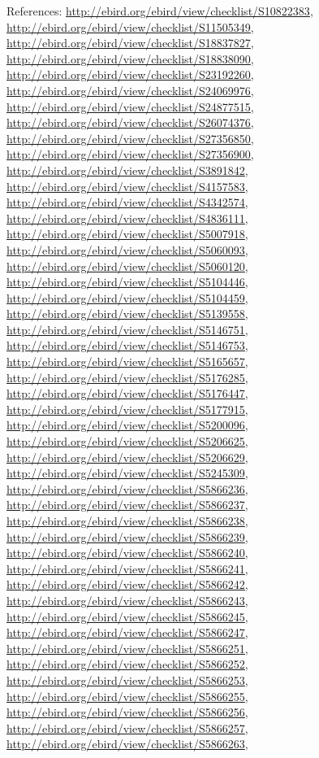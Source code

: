 \documentclass[9pt, article]{memoir}
\begin{document}
\begin{multicols}{2}
References: 
\url{http://ebird.org/ebird/view/checklist/S10822383}, 
\url{http://ebird.org/ebird/view/checklist/S11505349}, 
\url{http://ebird.org/ebird/view/checklist/S18837827}, 
\url{http://ebird.org/ebird/view/checklist/S18838090}, 
\url{http://ebird.org/ebird/view/checklist/S23192260}, 
\url{http://ebird.org/ebird/view/checklist/S24069976}, 
\url{http://ebird.org/ebird/view/checklist/S24877515}, 
\url{http://ebird.org/ebird/view/checklist/S26074376}, 
\url{http://ebird.org/ebird/view/checklist/S27356850}, 
\url{http://ebird.org/ebird/view/checklist/S27356900}, 
\url{http://ebird.org/ebird/view/checklist/S3891842}, 
\url{http://ebird.org/ebird/view/checklist/S4157583}, 
\url{http://ebird.org/ebird/view/checklist/S4342574}, 
\url{http://ebird.org/ebird/view/checklist/S4836111}, 
\url{http://ebird.org/ebird/view/checklist/S5007918}, 
\url{http://ebird.org/ebird/view/checklist/S5060093}, 
\url{http://ebird.org/ebird/view/checklist/S5060120}, 
\url{http://ebird.org/ebird/view/checklist/S5104446}, 
\url{http://ebird.org/ebird/view/checklist/S5104459}, 
\url{http://ebird.org/ebird/view/checklist/S5139558}, 
\url{http://ebird.org/ebird/view/checklist/S5146751}, 
\url{http://ebird.org/ebird/view/checklist/S5146753}, 
\url{http://ebird.org/ebird/view/checklist/S5165657}, 
\url{http://ebird.org/ebird/view/checklist/S5176285}, 
\url{http://ebird.org/ebird/view/checklist/S5176447}, 
\url{http://ebird.org/ebird/view/checklist/S5177915}, 
\url{http://ebird.org/ebird/view/checklist/S5200096}, 
\url{http://ebird.org/ebird/view/checklist/S5206625}, 
\url{http://ebird.org/ebird/view/checklist/S5206629}, 
\url{http://ebird.org/ebird/view/checklist/S5245309}, 
\url{http://ebird.org/ebird/view/checklist/S5866236}, 
\url{http://ebird.org/ebird/view/checklist/S5866237}, 
\url{http://ebird.org/ebird/view/checklist/S5866238}, 
\url{http://ebird.org/ebird/view/checklist/S5866239}, 
\url{http://ebird.org/ebird/view/checklist/S5866240}, 
\url{http://ebird.org/ebird/view/checklist/S5866241}, 
\url{http://ebird.org/ebird/view/checklist/S5866242}, 
\url{http://ebird.org/ebird/view/checklist/S5866243}, 
\url{http://ebird.org/ebird/view/checklist/S5866245}, 
\url{http://ebird.org/ebird/view/checklist/S5866247}, 
\url{http://ebird.org/ebird/view/checklist/S5866251}, 
\url{http://ebird.org/ebird/view/checklist/S5866252}, 
\url{http://ebird.org/ebird/view/checklist/S5866253}, 
\url{http://ebird.org/ebird/view/checklist/S5866255}, 
\url{http://ebird.org/ebird/view/checklist/S5866256}, 
\url{http://ebird.org/ebird/view/checklist/S5866257}, 
\url{http://ebird.org/ebird/view/checklist/S5866263}, 

\end{multicols}
\end{document}
